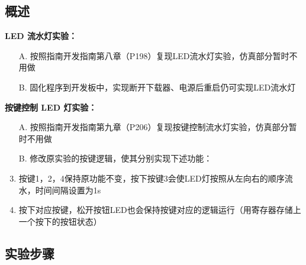 \documentclass[UTF8]{article}
\theoremstyle{MyLineTheoremStyle} %
\theoremstyle{MyBlockTheoremStyle} %
\theoremstyle{MySubsubsectionStyle} %
\begin{document}
\subsection{概述}
\textbf{LED 流水灯实验：}
\begin{enumerate}
\item[A.] 按照指南开发指南第八章（P198）复现LED流水灯实验，仿真部分暂时不用做
\item[B.] 固化程序到开发板中，实现断开下载器、电源后重启仍可实现LED流水灯
\end{enumerate}

\textbf{按键控制 LED 灯实验：}
\begin{enumerate}
\item[A.] 按照指南开发指南第九章（P206）复现按键控制流水灯实验，仿真部分暂时不用做
\item[B.] 修改原实验的按键逻辑，使其分别实现下述功能：
\item 按键1，2，4保持原功能不变，按下按键3会使LED灯按照从左向右的顺序流水，时间间隔设置为1s
\item 按下对应按键，松开按钮LED也会保持按键对应的逻辑运行（用寄存器存储上一个按下的按钮状态）
\end{enumerate}

\subsection{实验步骤}
\end{document}
